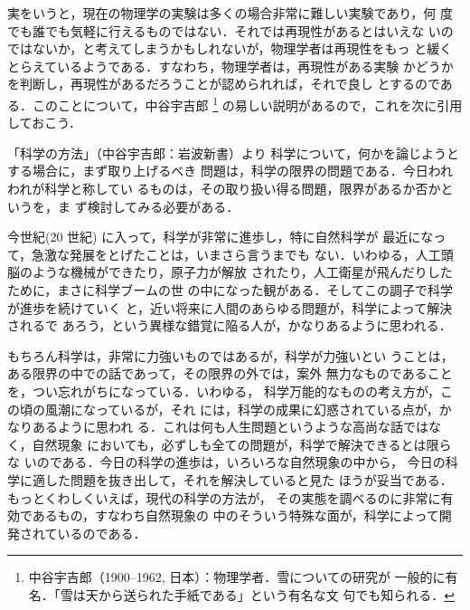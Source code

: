             実をいうと，現在の物理学の実験は多くの場合非常に難しい実験であり，何
            度でも誰でも気軽に行えるものではない．それでは再現性があるとはいえな
            いのではないか，と考えてしまうかもしれないが，物理学者は再現性をもっ
            と緩くとらえているようである．すなわち，物理学者は，再現性がある実験
            かどうかを判断し，再現性があるだろうことが認められれば，それで良し
            とするのである．このことについて，中谷宇吉郎
                \footnote{
                    中谷宇吉郎（1900--1962, 日本）：物理学者．雪についての研究が
                    一般的に有名．「雪は天から送られた手紙である」という有名な文
                    句でも知られる．
                }
            の易しい説明があるので，これを次に引用しておこう．
                \begin{memo}{「科学の方法」（中谷宇吉郎：岩波新書）より}
                    科学について，何かを論じようとする場合に，まず取り上げるべき
                    問題は，科学の限界の問題である．今日われわれが科学と称してい
                    るものは，その取り扱い得る問題，限界があるか否かというを，ま
                    ず検討してみる必要がある．

                    今世紀(20 世紀) に入って，科学が非常に進歩し，特に自然科学が
                    最近になって，急激な発展をとげたことは，いまさら言うまでも
                    ない．いわゆる，人工頭脳のような機械ができたり，原子力が解放
                    されたり，人工衛星が飛んだりしたために，まさに科学ブームの世
                    の中になった観がある．そしてこの調子で科学が進歩を続けていく
                    と，近い将来に人間のあらゆる問題が，科学によって解決されるで
                    あろう，という異様な錯覚に陥る人が，かなりあるように思われる．

                    もちろん科学は，非常に力強いものではあるが，科学が力強いとい
                    うことは，ある限界の中での話であって，その限界の外では，案外
                    無力なものであることを，つい忘れがちになっている．いわゆる，
                    科学万能的なものの考え方が，この頃の風潮になっているが，それ
                    には，科学の成果に幻惑されている点が，かなりあるように思われ
                    る．これは何も人生問題というような高尚な話ではなく，自然現象
                    においても，必ずしも全ての問題が，科学で解決できるとは限らな
                    いのである．今日の科学の進歩は，いろいろな自然現象の中から，
                    今日の科学に適した問題を抜き出して，それを解決していると見た
                    ほうが妥当である．もっとくわしくいえば，現代の科学の方法が，
                    その実態を調べるのに非常に有効であるもの，すなわち自然現象の
                    中のそういう特殊な面が，科学によって開発されているのである．


\end{memo}
